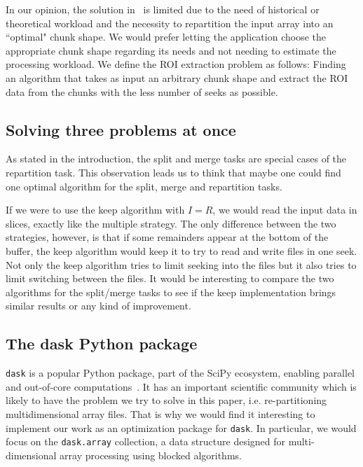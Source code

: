 \documentclass[sigconf, nonacm]{acmart}
\begin{document}
In our opinion, the solution in~\cite{optimal_chuking} is limited due to the
need of historical or theoretical workload and the necessity to repartition the
input array into an ``optimal" chunk shape.
We would prefer letting the application choose the appropriate chunk shape
regarding its needs and not needing to estimate the processing workload.
We define the ROI extraction problem as follows: Finding an algorithm that takes
as input an arbitrary chunk shape and extract the ROI data from the chunks with
the less number of seeks as possible.

\subsection{Solving three problems at once}
As stated in the introduction, the split and merge tasks are special cases of
the repartition task. This observation leads us to think that maybe one could find
one optimal algorithm for the split, merge and repartition tasks.

If we were to use the keep algorithm with $I=R$, we would read the input data
in slices, exactly like the multiple strategy. The only difference between the
two strategies, however, is that if some remainders appear at the bottom of the
buffer, the keep algorithm would keep it to try to read and write files in one
seek. Not only the keep algorithm tries to limit seeking into the files but it
also tries to limit switching between the files. It would be interesting to
compare the two algorithms for the split/merge tasks to see if the keep
implementation brings similar results or any kind of improvement.

\subsection{The dask Python package}
\texttt{dask} is a popular Python package, part of the SciPy ecosystem, enabling
parallel and out-of-core computations~\cite{matthew_rocklin-proc-scipy-2015}.
It has an important scientific community which is likely to have the problem we
try to solve in this paper, i.e. re-partitioning multidimensional array files.
That is why we would find it interesting to implement our work as an optimization
package for \texttt{dask}.
In particular, we would focus on the \texttt{dask.array} collection, a data
structure designed for multi-dimensional array processing using blocked
algorithms.
\end{document}
